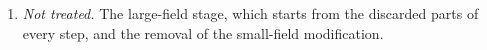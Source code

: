 \begin{remark}
\begin{enumerate}[label=(\alph*)]
\item \emph{Not treated.} The large-field stage, which starts from the discarded parts of every step, and the removal of the small-field modification.
\end{enumerate}
\end{remark}
